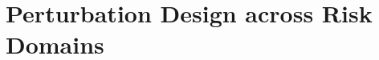 \documentclass{article} %
\begin{document}



\section{Perturbation Design across Risk Domains}
\label{sec:systematization}
\end{document}
